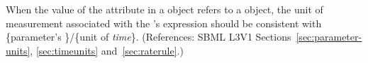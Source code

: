 When the value of the attribute  in a \RateRule object
refers to a \Parameter object, the unit of measurement associated with
the \RateRule's  expression should be consistent with
\{parameter's \}/\{unit of \emph{time}\}. (References: SBML
L3V1 Sections~\ref{sec:parameter-units}, \ref{sec:timeunits}
and~\ref{sec:raterule}.)

